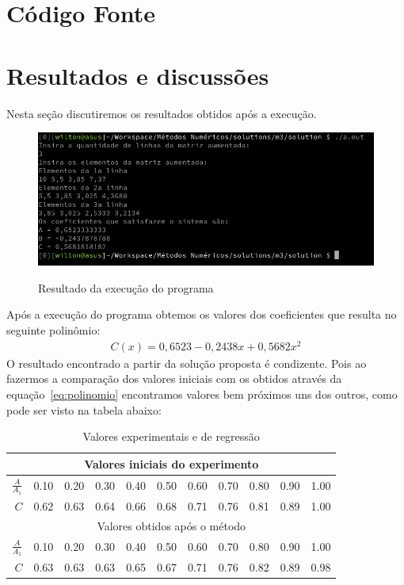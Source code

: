 \documentclass[12pt, hidelinks]{article}
\begin{document}
\newpage
\section{Código Fonte}



\newpage
\section{Resultados e discussões}

Nesta seção discutiremos os resultados obtidos após a execução.

\begin{figure}[!h]
  \centering
  \includegraphics[width=15cm]{figuras/printx.png}\\
  \caption{Resultado da execução do programa}\label{fig:printx}
\end{figure}
Após a execução do programa obtemos os valores dos coeficientes que resulta no seguinte polinômio:
\begin{eqnarray}\label{eq:polinomio}
  C(x) = 0,6523 - 0,2438x + 0,5682x^2
\end{eqnarray}
O resultado encontrado a partir da solução proposta é condizente. Pois ao fazermos a comparação dos valores iniciais com os obtidos através da equação~\eqref{eq:polinomio} encontramos valores bem próximos uns dos outros, como pode ser visto na tabela abaixo:

\begin{table}[h]
  \centering
  \vspace{0.5cm}
  \begin{tabular}{|r|r|r|r|r|r|r|r|r|r|r|}
    \hline
    \multicolumn{11}{|c|}{Valores iniciais do experimento} \\
    \hline
      $\frac{A}{A_1}$ & 0.10 & 0.20 & 0.30 & 0.40 & 0.50 & 0.60 & 0.70 & 0.80 & 0.90 & 1.00\\
    \hline
      $C$ & 0.62 & 0.63 & 0.64 & 0.66 & 0.68 & 0.71 & 0.76 & 0.81 & 0.89 & 1.00\\
    \hline
    \multicolumn{11}{|c|}{Valores obtidos após o método} \\
    \hline
      $\frac{A}{A_1}$ & 0.10 & 0.20 & 0.30 & 0.40 & 0.50 & 0.60 & 0.70 & 0.80 & 0.90 & 1.00\\
    \hline
      $C$ & 0.63 & 0.63 & 0.63 & 0.65 & 0.67 & 0.71 & 0.76 & 0.82 & 0.89 & 0.98\\
    \hline
  \end{tabular}
  \caption{Valores experimentais e de regressão}
\end{table}
\end{document}

